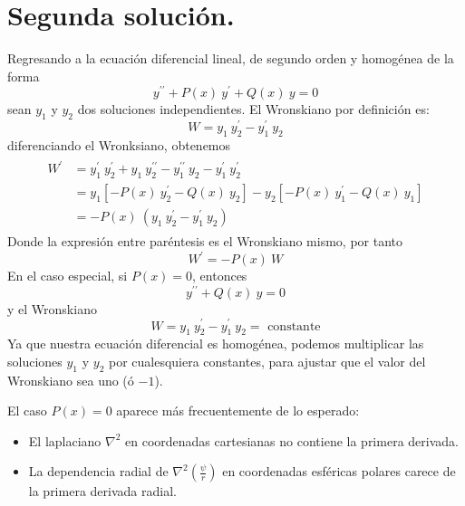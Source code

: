 \section{Segunda solución.}
Regresando a la ecuación diferencial lineal, de segundo orden y homogénea de la forma
\begin{equation}
y^{\prime \prime} + P(x) \: y^{\prime} + Q(x) \: y = 0
\label{eq:ecuacion_09_118}
\end{equation}
sean $y_{1}$ y $y_{2}$ dos soluciones independientes. El Wronskiano por definición es:
\begin{equation}
W = y_{1} \: y^{\prime}_{2} - y^{\prime}_{1} \: y_{2}
\label{eq:ecuacion_09_119}
\end{equation}
diferenciando el Wronksiano, obtenemos
\begin{align}
\begin{aligned}
W^{\prime} &= y^{\prime}_{1} \: y_{2}^{\prime} + y_{1} \: y^{\prime \prime}_{2} - y^{\prime \prime}_{1} \: y_{2} - y^{\prime}_{1} \: y^{\prime}_{2} \\
&= y_{1} [ - P(x) \: y^{\prime}_{2} - Q(x) \: y_{2}] - y_{2} [ - P(x) \: y^{\prime}_{1} - Q(x)  \: y_{1}] \\
&= - P(x) \: (y_{1} \: y^{\prime}_{2} - y^{\prime}_{1} \: y_{2})
\end{aligned}
\end{align}
Donde la expresión entre paréntesis es el Wronskiano mismo, por tanto
\begin{equation}
W^{\prime} = - P(x) \: W
\label{eq:ecuacion_09_120}
\end{equation}
En el caso especial, si $P(x) = 0$, entonces
\begin{equation}
y^{\prime \prime} + Q(x) \: y = 0
\label{eq:ecuacion_09_121}
\end{equation}
y el Wronskiano
\begin{equation}
W = y_{1} \: y^{\prime}_{2} - y^{\prime}_{1} \: y_{2} = \mbox{ constante}
\label{eq:ecuacion_09_1202}
\end{equation}
Ya que nuestra ecuación diferencial es homogénea, podemos multiplicar las soluciones $y_{1}$ y $y_{2}$ por cualesquiera constantes, para ajustar que el valor del Wronskiano sea uno (ó $-1$).
\par
El caso $P(x) = 0$ aparece más frecuentemente de lo esperado:
\begin{itemize}
\item El laplaciano $\nabla^{2}$ en coordenadas cartesianas no contiene la primera derivada.
\item La dependencia radial de $\nabla^{2} (\frac{\psi}{r})$ en coordenadas esféricas polares carece de la primera derivada radial.
\end{itemize}
